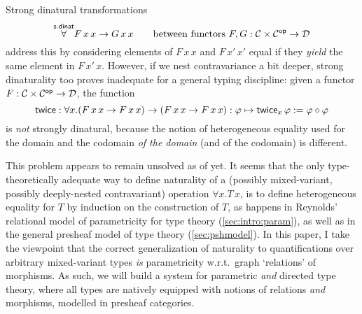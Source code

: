 \documentclass{lmcs} %
\theoremstyle{plain}\newtheorem{satz}[thm]{Satz} %
\theoremstyle{plain}
\theoremstyle{definition}
\newenvironment{example}[0]{\begin{exa}}{\end{exa}}
\begin{document}
Strong dinatural transformations
\[
	\overset{\mathsf{s.dinat}}{\forall} F\,x\,x \to G\,x\,x \qquad \text{between functors $F, G : {\mathcal{C}} \times {\mathcal{C}}^{\mathsf{op}} \to {\mathcal{D}}$}
\]
address this by considering elements of $F\,x\,x$ and $F\,x'\,x'$ equal if they \emph{yield} the same element in $F\,x'\,x$.
However, if we nest contravariance a bit deeper, strong dinaturality too proves inadequate for a general typing discipline: given a functor $F : {\mathcal{C}} \times {\mathcal{C}}^{\mathsf{op}} \to {\mathcal{D}}$, the function
\[
	\mathsf{twice} : \forall x . (F\,x\,x \to F\,x\,x) \to (F\,x\,x \to F\,x\,x) : \varphi \mapsto \mathsf{twice}_x\,\varphi := \varphi \circ \varphi
\]
is \emph{not} strongly dinatural, because the notion of heterogeneous equality used for the domain and the codomain \emph{of the domain} (and of the codomain) is different.


This problem appears to remain unsolved as of yet.
It seems that the only type-theoretically adequate way to define naturality of a (possibly mixed-variant, possibly deeply-nested contravariant) operation $\forall x.T\,x$, is to define heterogeneous equality for $T$ by induction on the construction of $T$, as happens in Reynolds' relational model of parametricity for type theory \cite{reynolds} (\cref{sec:intro:param}), as well as in the general presheaf model of type theory \cite[ch.\ 4]{Hofmann97} (\cref{sec:pshmodel}).
In this paper, I take the viewpoint that the correct generalization of naturality to quantifications over arbitrary mixed-variant types \emph{is} parametricity w.r.t.\ graph `relations' of morphisms.
As such, we will build a system for parametric \emph{and} directed type theory, where all types are natively equipped with notions of relations \emph{and} morphisms, modelled in presheaf categories.
\end{document}
